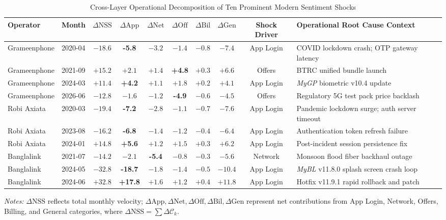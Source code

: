 \documentclass[5p,twocolumn,authoryear]{elsarticle}
\begin{document}
\begin{table}[t]
\centering
\caption{Cross-Layer Operational Decomposition of Ten Prominent Modern Sentiment Shocks}
\label{tab:shocks}
\footnotesize
\setlength{\tabcolsep}{4pt}
\begin{tabularx}{\textwidth}{@{}llcccccccX@{}}
\toprule
Operator & Month & $\Delta\text{NSS}$ & $\Delta\text{App}$ & $\Delta\text{Net}$ & $\Delta\text{Off}$ & $\Delta\text{Bil}$ & $\Delta\text{Gen}$ & Shock Driver & Operational Root Cause Context \\
\midrule
Grameenphone & 2020-04 & $-18.6$ & \textbf{-5.8} & $-3.2$ & $-1.4$ & $-0.8$ & $-7.4$ & App Login & COVID lockdown crash; OTP gateway latency \\
Grameenphone & 2021-09 & $+15.2$ & $+2.1$ & $+1.4$ & \textbf{+4.8} & $+0.3$ & $+6.6$ & Offers & BTRC unified bundle launch \\
Grameenphone & 2024-03 & $+11.4$ & \textbf{+4.2} & $+1.1$ & $+1.8$ & $+0.2$ & $+4.1$ & App Login & \textit{MyGP} biometric v10.4 update \\
Grameenphone & 2026-06 & $-12.8$ & $-1.6$ & $-1.2$ & \textbf{-4.9} & $-0.6$ & $-4.5$ & Offers & Regulatory 5G test pack price backlash \\
\addlinespace
Robi Axiata & 2020-03 & $-19.4$ & \textbf{-7.2} & $-2.8$ & $-1.1$ & $-0.7$ & $-7.6$ & App Login & Pandemic lockdown surge; auth server timeout \\
Robi Axiata & 2023-08 & $-16.2$ & \textbf{-6.8} & $-1.4$ & $-1.2$ & $-0.4$ & $-6.4$ & App Login & Authentication token refresh failure \\
Robi Axiata & 2024-01 & $+14.8$ & \textbf{+5.6} & $+1.2$ & $+1.5$ & $+0.3$ & $+6.2$ & App Login & Post-incident session persistence fix \\
\addlinespace
Banglalink & 2021-07 & $-14.2$ & $-2.1$ & \textbf{-5.4} & $-0.8$ & $-0.3$ & $-5.6$ & Network & Monsoon flood fiber backhaul outage \\
Banglalink & 2024-05 & $-32.8$ & \textbf{-18.7} & $-1.8$ & $-1.4$ & $-0.5$ & $-10.4$ & App Login & \textit{MyBL} v11.8.0 splash screen crash loop \\
Banglalink & 2024-06 & $+32.8$ & \textbf{+17.8} & $+1.6$ & $+1.2$ & $+0.4$ & $+11.8$ & App Login & Hotfix v11.9.1 rapid rollback and patch \\
\bottomrule
\end{tabularx}
\vspace{0.4em}
\parbox{\textwidth}{\footnotesize \textit{Notes:} $\Delta\text{NSS}$ reflects total monthly velocity; $\Delta\text{App}, \Delta\text{Net}, \Delta\text{Off}, \Delta\text{Bil}, \Delta\text{Gen}$ represent net contributions from App Login, Network, Offers, Billing, and General categories, where $\Delta\text{NSS} = \sum \Delta \mathcal{C}_k$.}
\end{table}
\end{document}
